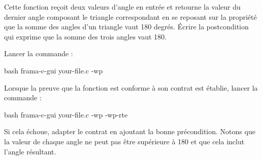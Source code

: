 

Cette fonction reçoit deux valeurs d'angle en entrée et retourne
la valeur du dernier angle composant le triangle correspondant en se
reposant sur la propriété que la somme des angles d'un triangle vaut
180 degrés. Écrire la postcondition qui exprime que la somme des trois
angles vaut 180.




Lancer la commande :


\begin{CodeBlock}{bash}
frama-c-gui your-file.c -wp
\end{CodeBlock}


Lorsque la preuve que la fonction est conforme à son contrat est établie, lancer
la commande :

\begin{CodeBlock}{bash}
frama-c-gui your-file.c -wp -wp-rte
\end{CodeBlock}


Si cela échoue, adapter le contrat en ajoutant la bonne précondition.
Notons que la valeur de chaque angle ne peut pas être supérieure à 180
et que cela inclut l'angle résultant.


